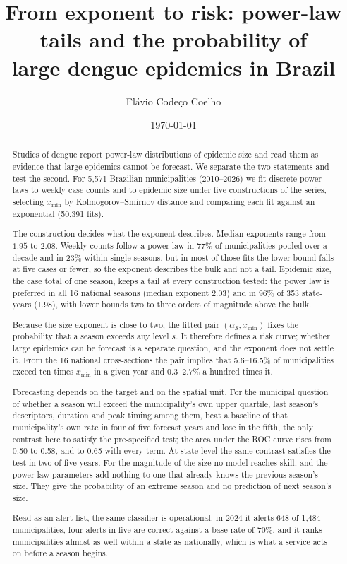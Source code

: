 \documentclass[english,10pt,b5paper]{article}
\title{From exponent to risk: power-law tails and the probability of\\
large dengue epidemics in Brazil}
\author{Fl\'avio Code\c{c}o Coelho}
\date{\today}
\begin{document}
\maketitle

\begin{abstract}
Studies of dengue report power-law distributions of epidemic size and read them as
evidence that large epidemics cannot be forecast. We separate the two statements and
test the second. For 5{,}571 Brazilian municipalities (2010--2026) we fit discrete
power laws to weekly case counts and to epidemic size under five constructions of
the series, selecting $x_{\min}$ by Kolmogorov--Smirnov distance and comparing each
fit against an exponential (50{,}391 fits).

The construction decides what the exponent describes. Median exponents range from
$1.95$ to $2.08$. Weekly counts follow a power law in 77\% of municipalities pooled
over a decade and in 23\% within single seasons, but in most of those fits the lower
bound falls at five cases or fewer, so the exponent describes the bulk and not a
tail. Epidemic size, the case total of one season, keeps a tail at every
construction tested: the power law is preferred in all 16 national seasons (median
exponent 2.03) and in 96\% of 353 state-years (1.98), with lower bounds two to three
orders of magnitude above the bulk.

Because the size exponent is close to two, the fitted pair $(\alpha_S, x_{\min})$
fixes the probability that a season exceeds any level $s$. It therefore defines a
risk curve; whether large epidemics can be forecast is a separate question, and the
exponent does not settle it. From the 16 national cross-sections the pair implies
that 5.6--16.5\% of municipalities exceed ten times $x_{\min}$ in a given year and
0.3--2.7\% a hundred times it.

Forecasting depends on the target and on the spatial unit. For the municipal
question of whether a season will exceed the municipality's own upper quartile,
last season's descriptors, duration and peak timing among them, beat a baseline
of that municipality's own rate in four of five forecast years and lose in the
fifth, the only contrast here to satisfy the pre-specified test; the area under
the ROC curve rises from 0.50 to 0.58, and to 0.65 with every term. At state
level the same contrast satisfies the test in two of five years. For the
magnitude of the size no model reaches skill, and the power-law parameters add
nothing to one that already knows the previous season's size. They give the
probability of an extreme season and no prediction of next season's size.

Read as an alert list, the same classifier is operational: in 2024 it alerts 648
of 1{,}484 municipalities, four alerts in five are correct against a base rate of
70\%, and it ranks municipalities almost as well within a state as nationally,
which is what a service acts on before a season begins.

\end{abstract}
\end{document}
